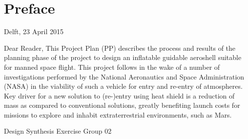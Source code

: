 \section*{Preface}\label{cha:preface}

\begin{flushright}
Delft, 23 April 2015
\end{flushright}

Dear Reader,	
\newline
\newline
\newline
This Project Plan (PP) describes the process and results of the planning phase of the project to design an inflatable guidable aeroshell suitable for manned space flight. This project follows in the wake of a number of investigations performed by the National Aeronautics and Space Administration (NASA) in the viability of such a vehicle for entry and re-entry of atmospheres. Key driver for a new solution to (re-)entry using heat shield is a reduction of mass as compared to conventional solutions, greatly benefiting launch costs for missions to explore and inhabit extraterrestrial environments, such as Mars. 


\newline
\newline
\newline
\newline
Design Synthesis Exercise Group 02